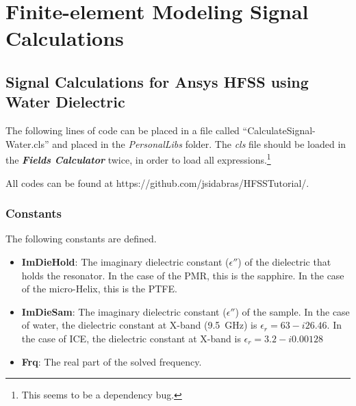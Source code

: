 \chapter[Finite-element Modeling Signal Calculations]{Finite-element Modeling Signal Calculations}

\section*{Signal Calculations for Ansys HFSS using Water Dielectric}

The following lines of code can be placed in a file called ``CalculateSignal-Water.cls'' and placed in the \textit{PersonalLibs} folder. The \textit{cls} file should be loaded in the \textit{\textbf{Fields Calculator}} twice, in order to load all expressions.\footnote{This seems to be a dependency bug.} 

All codes can be found at https://github.com/jsidabras/HFSSTutorial/.


\subsection*{Constants}
The following constants are defined. 
\begin{itemize}
    \item \textbf{ImDieHold}: The imaginary dielectric constant ($\epsilon''$) of the dielectric that holds the resonator. In the case of the PMR, this is the sapphire. In the case of the micro-Helix, this is the PTFE.
    \item \textbf{ImDieSam}: The imaginary dielectric constant ($\epsilon''$) of the sample. In the case of water, the dielectric constant at X-band (9.5~GHz) is $\epsilon_r = 63 - i 26.46$. In the case of ICE, the dielectric constant at X-band is $\epsilon_r = 3.2 - i 0.00128$
    \item \textbf{Frq}: The real part of the solved frequency.
\end{itemize}{}

\newpage

